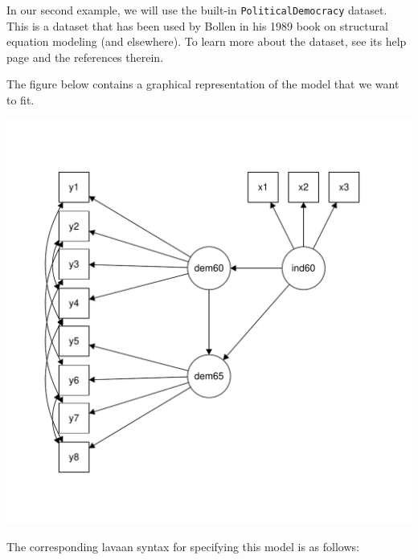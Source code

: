 In our second example, we will use the built-in
\texttt{PoliticalDemocracy} dataset. This is a dataset that has been
used by Bollen in his 1989 book on structural equation modeling (and
elsewhere). To learn more about the dataset, see its help page and the
references therein.

The figure below contains a graphical representation of the model that
we want to fit.

\includegraphics{figure/sem-1.pdf}

The corresponding lavaan syntax for specifying this model is as follows:

\begin{Shaded}
\begin{Highlighting}[]
\OtherTok{\textless{}{-}} \StringTok{\textquotesingle{}}
\StringTok{\textquotesingle{}}
\end{Highlighting}
\end{Shaded}

